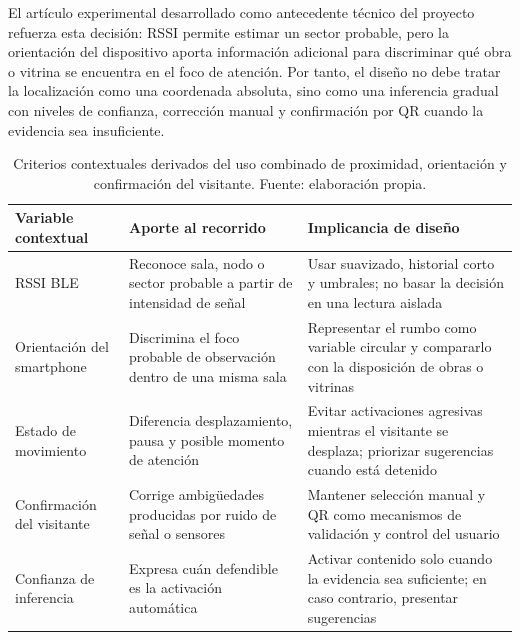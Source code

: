 El art\'iculo experimental desarrollado como antecedente t\'ecnico del proyecto refuerza esta decisi\'on: RSSI permite estimar un sector probable, pero la orientaci\'on del dispositivo aporta informaci\'on adicional para discriminar qu\'e obra o vitrina se encuentra en el foco de atenci\'on. Por tanto, el dise\~no no debe tratar la localizaci\'on como una coordenada absoluta, sino como una inferencia gradual con niveles de confianza, correcci\'on manual y confirmaci\'on por QR cuando la evidencia sea insuficiente.

\begin{table}[h!]
    \centering
    \footnotesize
    \setlength{\tabcolsep}{4pt}
    \begin{tabular}{>{\raggedright\arraybackslash}p{3.3cm} >{\raggedright\arraybackslash}p{5.1cm} >{\raggedright\arraybackslash}p{5.4cm}}
        \hline
        \textbf{Variable contextual} & \textbf{Aporte al recorrido} & \textbf{Implicancia de dise\~no} \\
        \hline
        RSSI BLE & Reconoce sala, nodo o sector probable a partir de intensidad de se\~nal & Usar suavizado, historial corto y umbrales; no basar la decisi\'on en una lectura aislada \\
        Orientaci\'on del smartphone & Discrimina el foco probable de observaci\'on dentro de una misma sala & Representar el rumbo como variable circular y compararlo con la disposici\'on de obras o vitrinas \\
        Estado de movimiento & Diferencia desplazamiento, pausa y posible momento de atenci\'on & Evitar activaciones agresivas mientras el visitante se desplaza; priorizar sugerencias cuando est\'a detenido \\
        Confirmaci\'on del visitante & Corrige ambig\"uedades producidas por ruido de se\~nal o sensores & Mantener selecci\'on manual y QR como mecanismos de validaci\'on y control del usuario \\
        Confianza de inferencia & Expresa cu\'an defendible es la activaci\'on autom\'atica & Activar contenido solo cuando la evidencia sea suficiente; en caso contrario, presentar sugerencias \\
        \hline
    \end{tabular}
    \caption[Criterios contextuales para la mediaci\'on situada]{Criterios contextuales derivados del uso combinado de proximidad, orientaci\'on y confirmaci\'on del visitante. Fuente: elaboraci\'on propia.}
    \label{tab:criterios-contextuales-mediacion}
\end{table}


